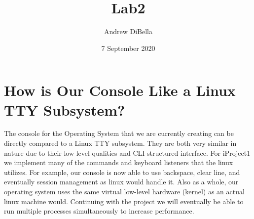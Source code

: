 \documentclass{article}
\title{Lab2}
\author{Andrew DiBella }
\date{7 September 2020}
\begin{document}
\maketitle

\section{How is Our Console Like a Linux TTY Subsystem?}

The console for the Operating System that we are currently creating can be directly compared to a Linux TTY subsystem. They are both very similar in nature due to their low level qualities and CLI structured interface. For iProject1 we implement many of the commands and keyboard listeners that the linux utilizes. For example, our console is now able to use backspace, clear line, and eventually session management as linux would handle it. Also as a whole, our operating system uses the same virtual low-level hardware (kernel) as an actual linux machine would. Continuing with the project we will eventually be able to run multiple processes simultaneously to increase performance.  
\end{document}
